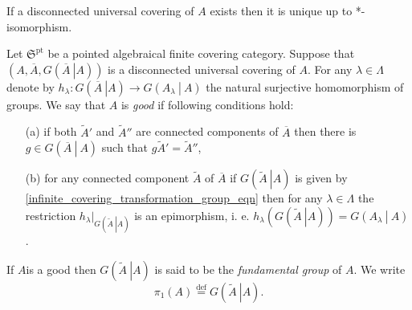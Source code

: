 \documentclass{beamer}
\theoremstyle{plain}
\newcommand{\la}{\lambda}
\newcommand{\La}{\Lambda}
\newcommand{\bydef}{\stackrel{\mathrm{def}}{=}}
\begin{document}
\begin{frame}
\begin{lemma}\label{uni_dicsonnected_lem}
	If a disconnected universal covering of $A$ exists then it is unique up to *-isomorphism. 
\end{lemma}

\begin{definition}\label{good_defn}
	Let	$\mathfrak{S}^{\mathrm{pt}}$ be a pointed algebraical  finite covering category.   Suppose that $\left(A, \overline{A}, G\left(\left.\overline{A}~\right| A\right)\right)$ is a disconnected universal covering of $A$. For any $\la \in \La$ denote by $h_\la: G\left(\left.\overline{A}~\right| A\right) \to G\left(\left. A_\la~\right|~A \right)$ the natural surjective homomorphism of groups.
	We say  that $A$  is \textit{good} if  following conditions hold:
	\begin{enumerate}
		\item[(a)] if both $\widetilde{A}'$ and $\widetilde{A}''$ are  {connected components} of $\overline A$ then there is  $g \in G\left(\left.\overline{A}~\right|~ A\right)$ such that $g \widetilde{A}'= \widetilde{A}''$,
		\item [(b)] for any connected component $\widetilde A$ of $\overline{A}$ if  $G\left(\left.\widetilde{A}~\right| A\right)$ is given by  \eqref{infinite_covering_transformation_group_eqn} then for any $\la \in \La$ the restriction $h_\la|_{G\left(\left.\widetilde{A}~\right| A\right)}$ is an epimorphism, i. e. $h_\la\left(G\left(\left.\widetilde{A}~\right| A\right) \right) = G\left(\left. A_\la~\right|~A \right)$.
	\end{enumerate}
\end{definition}

\end{frame}
\begin{frame}
	\begin{definition}
	If 	$A$is a good then $G\left(\left.\widetilde{A}~\right| A\right)$ is said to be the \textit{fundamental group} of $A$. We write
	$$
\pi_1\left(A \right) \bydef G\left(\left.\widetilde{A}~\right| A\right).	
	$$
	\end{definition}
\end{frame}
\end{document}
